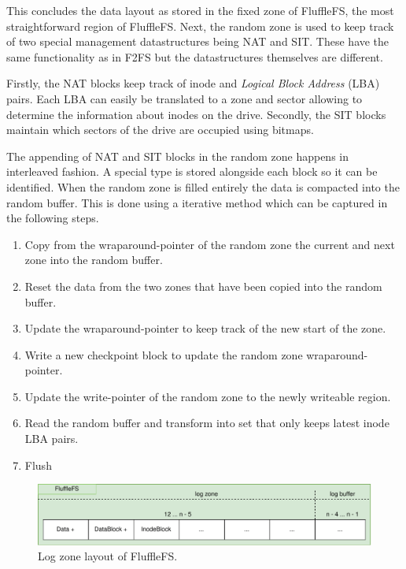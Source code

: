 
This concludes the data layout as stored in the fixed zone of FluffleFS, the
most straightforward region of FluffleFS. Next, the random zone is used to keep
track of two special management datastructures being NAT and SIT. These have the
same functionality as in F2FS but the datastructures themselves are different.

Firstly, the NAT blocks keep track of inode and \textit{Logical Block Address}
(LBA) pairs. Each LBA can easily be translated to a zone and sector allowing to
determine the information about inodes on the drive. Secondly, the SIT blocks
maintain which sectors of the drive are occupied using bitmaps.

The appending of NAT and SIT blocks in the random zone happens in interleaved
fashion. A special type is stored alongside each block so it can be identified.
When the random zone is filled entirely the data is compacted into the random
buffer. This is done using a iterative method which can be captured in the
following steps.

\begin{enumerate}
    \item Copy from the wraparound-pointer of the random zone the current and
    next zone into the random buffer.
    \item Reset the data from the two zones that have been copied into the
    random buffer.
    \item Update the wraparound-pointer to keep track of the new start of the
    zone.
    \item Write a new checkpoint block to update the random zone
    wraparound-pointer.
    \item Update the write-pointer of the random zone to the newly writeable
    region.
    \item Read the random buffer and transform into set that only keeps
    latest inode LBA pairs.
    \item Flush
\end{enumerate}

\begin{figure}[h!]
    \centering
	\includegraphics[width=1\textwidth]{resources/images/fluffle-layout-log.pdf}
	\caption{Log zone layout of FluffleFS.}
    \label{figure:flufflelayoutlog}
\end{figure}

